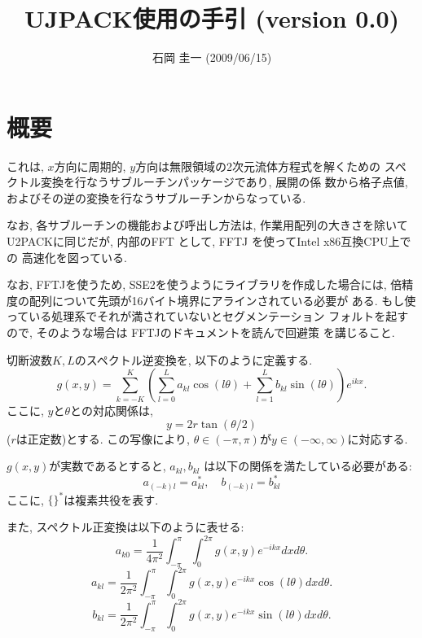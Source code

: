 \documentclass[a4j,fleqn]{jarticle}
\title{UJPACK使用の手引 (version 0.0)}
\author{石岡 圭一  (2009/06/15)}
\date{}
\begin{document}
\maketitle

\section{概要}

これは, $x$方向に周期的, $y$方向は無限領域の2次元流体方程式を解くための
スペクトル変換を行なうサブルーチンパッケージであり, 展開の係
数から格子点値, およびその逆の変換を行なうサブルーチンからなっている.

なお, 各サブルーチンの機能および呼出し方法は, 作業用配列の大きさを除いて
U2PACKに同じだが, 内部のFFT として, FFTJ を使ってIntel x86互換CPU上での
高速化を図っている.

なお, FFTJを使うため, SSE2を使うようにライブラリを作成した場合には, 
倍精度の配列について先頭が16バイト境界にアラインされている必要が
ある. もし使っている処理系でそれが満されていないとセグメンテーション
フォルトを起すので, そのような場合は FFTJのドキュメントを読んで回避策
を講じること.


切断波数$K,L$のスペクトル逆変換を, 以下のように定義する.
\begin{equation}
g(x,y)=\sum^K_{k=-K}\left(
\sum^L_{l=0}a_{kl}\cos(l\theta)
+\sum^L_{l=1}b_{kl}\sin(l\theta)\right)
e^{ikx}.
\end{equation}
ここに, $y$と$\theta$との対応関係は,
\begin{equation}
y=2r\tan(\theta/2)
\end{equation}
($r$は正定数)とする. この写像により,
$\theta\in(-\pi,\pi)$が$y\in(-\infty,\infty)$に対応する.

$g(x,y)$が実数であるとすると, $a_{kl},b_{kl}$
は以下の関係を満たしている必要がある:
\begin{equation}
a_{(-k)l}=a_{kl}^{*}, \quad b_{(-k)l}=b_{kl}^{*}
\end{equation}
ここに, $\{ \}^{*}$は複素共役を表す.

また, スペクトル正変換は以下のように表せる:
\begin{equation}
a_{k0}=\frac1{4\pi^2}\int^{\pi}_{-\pi}\int^{2\pi}_0
g(x,y)e^{-ikx}dxd\theta.
\end{equation}
\begin{equation}
a_{kl}=\frac1{2\pi^2}\int^{\pi}_{-\pi}\int^{2\pi}_0
g(x,y)e^{-ikx}\cos(l\theta)dxd\theta.
\end{equation}
\begin{equation}
b_{kl}=\frac1{2\pi^2}\int^{\pi}_{-\pi}\int^{2\pi}_0
g(x,y)e^{-ikx}\sin(l\theta)dxd\theta.
\end{equation}
\end{document}
